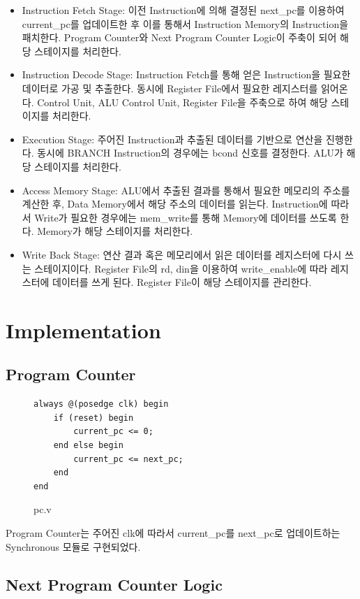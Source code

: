 \documentclass[openright, a4paper]{article}
\begin{document}
\begin{itemize}
    \item Instruction Fetch Stage: 이전 Instruction에 의해 결정된 next_pc를 이용하여 current_pc를 업데이트한 후 이를 통해서 Instruction Memory의 Instruction을 패치한다. Program Counter와 Next Program Counter Logic이 주축이 되어 해당 스테이지를 처리한다.
    \item Instruction Decode Stage: Instruction Fetch를 통해 얻은 Instruction을 필요한 데이터로 가공 및 추출한다. 동시에 Register File에서 필요한 레지스터를 읽어온다. Control Unit, ALU Control Unit, Register File을 주축으로 하여 해당 스테이지를 처리한다.
    \item Execution Stage: 주어진 Instruction과 추출된 데이터를 기반으로 연산을 진행한다. 동시에 BRANCH Instruction의 경우에는 bcond 신호를 결정한다. ALU가 해당 스테이지를 처리한다.
    \item Access Memory Stage: ALU에서 추출된 결과를 통해서 필요한 메모리의 주소를 계산한 후, Data Memory에서 해당 주소의 데이터를 읽는다. Instruction에 따라서 Write가 필요한 경우에는 mem_write를 통해 Memory에 데이터를 쓰도록 한다. Memory가 해당 스테이지를 처리한다.
    \item Write Back Stage: 연산 결과 혹은 메모리에서 읽은 데이터를 레지스터에 다시 쓰는 스테이지이다. Register File의 rd, din을 이용하여 write_enable에 따라 레지스터에 데이터를 쓰게 된다. Register File이 해당 스테이지를 관리한다.
\end{itemize}

\section{Implementation}

\subsection{Program Counter}

\begin{figure}[h]
    \begin{verbatim}
always @(posedge clk) begin
    if (reset) begin
        current_pc <= 0;
    end else begin
        current_pc <= next_pc;
    end
end
    \end{verbatim}
    \caption{pc.v}
\end{figure}

Program Counter는 주어진 clk에 따라서 current_pc를 next_pc로 업데이트하는 Synchronous 모듈로 구현되었다.

\subsection{Next Program Counter Logic}
\end{document}
